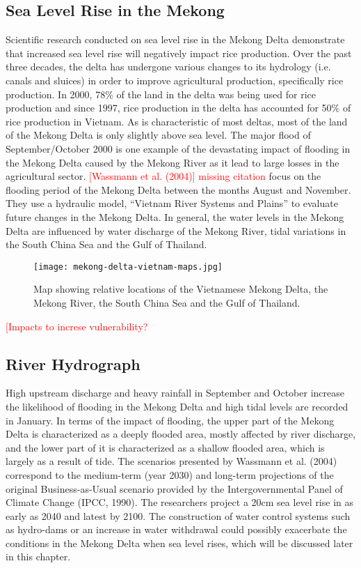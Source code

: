 \subsection{Sea Level Rise in the Mekong}

Scientific research conducted on sea level rise in the Mekong Delta demonstrate that increased sea level rise will negatively impact rice production. Over the past three decades, the delta has undergone various changes to its hydrology (i.e. canals and sluices) in order to improve agricultural production, specifically rice production. In 2000, 78\% of the land in the delta was being used for rice production and since 1997, rice production in the delta has accounted for 50\% of rice production in Vietnam. As is characteristic of most deltas, most of the land of the Mekong Delta is only slightly above sea level. The major flood of September/October 2000 is one example of the devastating impact of flooding in the Mekong Delta caused by the Mekong River as it lead to large losses in the agricultural sector. \textcolor{red}{[Wassmann et al. (2004)] missing citation} focus on the flooding period of the Mekong Delta between the months August and November. They use a hydraulic model, ``Vietnam River Systems and Plains''  to evaluate future changes in the Mekong Delta. In general, the water levels in the Mekong Delta are influenced by water discharge of the Mekong River, tidal variations in the South China Sea and the Gulf of Thailand. 

\begin{figure}
\texttt{[image: mekong-delta-vietnam-maps.jpg]}
\caption{Map showing relative locations of the Vietnamese Mekong Delta, the Mekong River, the South China Sea and the Gulf of Thailand.}
\end{figure}


\textcolor{red}{[Impacts to increse vulnerability?}

\subsection{River Hydrograph}

  High upstream discharge and heavy rainfall in September and October increase the likelihood of flooding in the Mekong Delta and high tidal levels are recorded in January. In terms of the impact of flooding, the upper part of the Mekong Delta is characterized as a deeply flooded area, mostly affected by river discharge, and the lower part of it is characterized as a shallow flooded area, which is largely as a result of tide. The scenarios presented by Wassmann et al. (2004) correspond to the medium-term (year 2030) and long-term projections  of the original Business-as-Usual scenario provided by the Intergovernmental Panel of Climate Change (IPCC, 1990). The researchers project a 20cm sea level rise in as early as 2040 and latest by 2100. The construction of water control systems such as hydro-dams or an increase in water withdrawal could possibly exacerbate the conditions in the Mekong Delta when sea level rises, which will be discussed later in this chapter.


